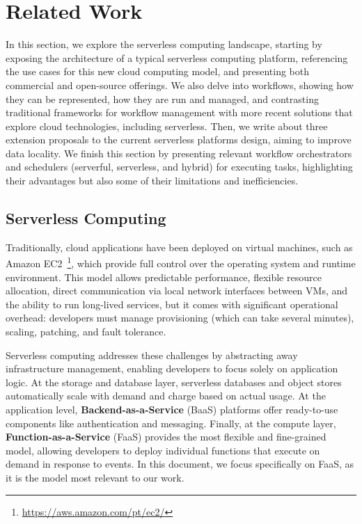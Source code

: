 \chapter{Related Work}
\chaptoc
\label{chap:rw}
\bigskip

In this section, we explore the serverless computing landscape, starting by exposing the architecture of a typical serverless computing platform, referencing the use cases for this new cloud computing model, and presenting both commercial and open-source offerings. We also delve into workflows, showing how they can be represented, how they are run and managed, and contrasting traditional frameworks for workflow management with more recent solutions that explore cloud technologies, including serverless. Then, we write about three extension proposals to the current serverless platforms design, aiming to improve data locality. We finish this section by presenting relevant workflow orchestrators and schedulers (serverful, serverless, and hybrid) for executing tasks, highlighting their advantages but also some of their limitations and inefficiencies.

\section{Serverless Computing}

Traditionally, cloud applications have been deployed on virtual machines, such as Amazon EC2~\footnote{\url{https://aws.amazon.com/pt/ec2/}}, which provide full control over the operating system and runtime environment. This model allows predictable performance, flexible resource allocation, direct communication via local network interfaces between VMs, and the ability to run long-lived services, but it comes with significant operational overhead: developers must manage provisioning (which can take several minutes), scaling, patching, and fault tolerance. 

Serverless computing addresses these challenges by abstracting away infrastructure management, enabling developers to focus solely on application logic. At the storage and database layer, serverless databases and object stores automatically scale with demand and charge based on actual usage. At the application level, \textbf{Backend-as-a-Service} (BaaS) platforms offer ready-to-use components like authentication and messaging. Finally, at the compute layer, \textbf{Function-as-a-Service} (FaaS) provides the most flexible and fine-grained model, allowing developers to deploy individual functions that execute on demand in response to events. In this document, we focus specifically on FaaS, as it is the model most relevant to our work.

